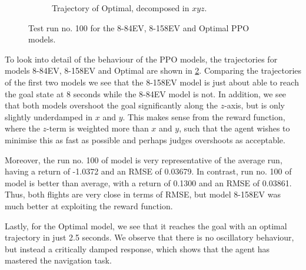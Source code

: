 \begin{figure}[H]
\begin{subfigure}[b]{0.49\textwidth}
         \caption{Trajectory of Optimal, decomposed in $xyz$.}
         \label{fig:testing_ppoOptimal2}
     \end{subfigure}
    \captionsetup{justification=centering}
    \caption{Test run no. 100 for the 8-84EV, 8-158EV and Optimal PPO models.}
     \label{fig:5_testing_PPO}
\end{figure}
To look into detail of the behaviour of the PPO models, the trajectories for models 8-84EV, 8-158EV and Optimal are shown in \cref{fig:5_testing_PPO}.
Comparing the trajectories of the first two models we see that the 8-158EV model is just about able to reach the goal state at 8 seconds while the 8-84EV model is not. In addition, we see that both models overshoot the goal significantly along the $z$-axis, but is only slightly underdamped in $x$ and $y$. This makes sense from the reward function, where the $z$-term is weighted more than $x$ and $y$, such that the agent wishes to minimise this as fast as possible and perhaps judges overshoots as acceptable.

Moreover, the run no. 100 of model \six is very representative of the average run, having a return of -1.0372 and an RMSE of 0.03679. In contrast, run no. 100 of model \eleven is better than average, with a return of 0.1300 and an RMSE of 0.03861. Thus, both flights are very close in terms of RMSE, but model 8-158EV was much better at exploiting the reward function.

Lastly, for the Optimal model, we see that it reaches the goal with an optimal trajectory in just 2.5 seconds. We observe that there is no oscillatory behaviour, but instead a critically damped response, which shows that the agent has mastered the navigation task. 

